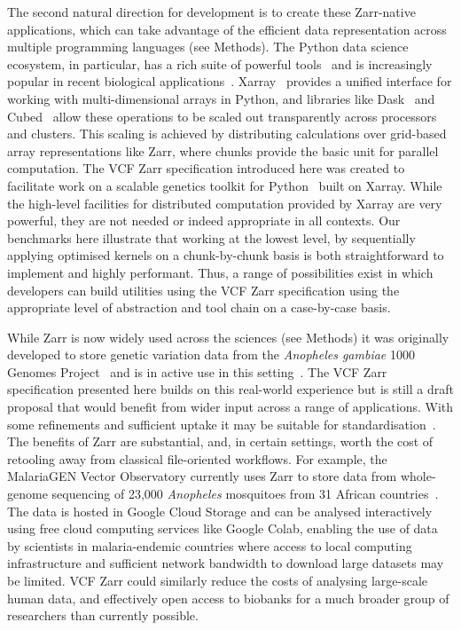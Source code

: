 \documentclass[a4paper,num-refs]{oup-contemporary}
\begin{document}
The second natural direction for development is to create
these Zarr-native applications, which can take advantage
of the efficient data representation
across multiple programming languages (see Methods).
The Python data science ecosystem, in particular,
has a rich suite of powerful tools~\cite[e.g.][]{
mckinney2010data,
lam2015numba,
kluyver2016jupyter,
harris2020array,
virtanen2020scipy} 
and is increasingly
popular in recent biological applications~\citep[e.g.][]{
abdennur2020cooler,
rand2022bionumpy,
open2c2024bioframe,
hou2024admix}.
Xarray~\cite{hoyer2017xarray} provides a unified interface for working 
with multi-dimensional arrays
in Python, and libraries like Dask~\cite{rocklin2015dask}  
and Cubed~\cite{cubed2024} allow these operations to be
scaled out transparently across processors and clusters. 
This scaling is achieved by distributing calculations over 
grid-based array representations like Zarr, where chunks
provide the basic unit for parallel computation.
The VCF Zarr specification introduced here was created 
to facilitate work on a scalable genetics toolkit for 
Python~\cite{sgkit2024} built on Xarray. 
While the high-level facilities for distributed 
computation provided by Xarray 
are very powerful, they are not needed or indeed
appropriate in all contexts. Our benchmarks here 
illustrate that working at the lowest level, 
by sequentially applying optimised kernels on a chunk-by-chunk
basis is both straightforward to implement and highly performant.
Thus, a range of possibilities exist in which developers 
can build utilities using the VCF Zarr specification
using the appropriate level of abstraction and tool chain
on a case-by-case basis.

While Zarr is now widely used across the sciences (see Methods)
it was originally 
developed to store genetic variation data from the 
\textit{Anopheles gambiae} 
1000 Genomes Project~\citep{anopheles2017genetic}
and is in active use in this 
setting~\cite[e.g.][]{ahouidi2021open,trimarsanto2022molecular}.
The VCF Zarr specification presented here builds on this real-world 
experience but is still a draft proposal that would benefit 
from wider input across a range of applications. With some 
refinements and sufficient uptake it may be suitable 
for standardisation~\cite{rehm2021ga4gh}.
The benefits of Zarr are substantial, and, in certain settings,
worth the cost of retooling away from classical file-oriented workflows.
For example, the MalariaGEN Vector Observatory
currently uses Zarr to store data from whole-genome sequencing 
of 23,000 \textit{Anopheles} mosquitoes from 31 African 
countries~\cite{mvgo2024}.
The data is hosted in Google Cloud Storage and can be analysed interactively
using free cloud computing services like Google Colab,
enabling the use of data by scientists in malaria-endemic countries
where access to local computing infrastructure and sufficient network 
bandwidth to download large datasets may be limited.
VCF Zarr could similarly reduce the costs of analysing large-scale
human data, and effectively open access to biobanks
for a much broader group of researchers than currently possible.
\end{document}
